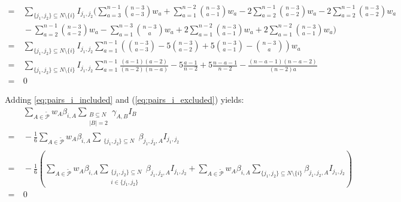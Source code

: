 \begin{equation}
\begin{array}{rll}
        = & \ \sum\limits_{\{j_1,j_2\} \subseteq N \setminus \{i\}} I_{j_1,j_2} \Bigg( \sum\limits_{a=3}^{n-1} \binom{n-3}{a-3} w_a + \sum\limits_{a=1}^{n-2} \binom{n-3}{a-1} w_a - 2\sum\limits_{a=2}^{n-1} \binom{n-3}{a-2} w_a - 2\sum\limits_{a=2}^{n-1} \binom{n-3}{a-2} w_a \\
        & \ - \sum\limits_{a=2}^{n-1} \binom{n-3}{a-2} w_a - \sum\limits_{a=1}^{n-3} \binom{n-3}{a} w_a + 2\sum\limits_{a=1}^{n-2} \binom{n-3}{a-1} w_a + 2\sum\limits_{a=1}^{n-2} \binom{n-3}{a-1} w_a \Bigg) \\
        = & \ \sum\limits_{\{j_1,j_2\} \subseteq N \setminus \{i\}} I_{j_1,j_2} \sum\limits_{a=1}^{n-1} \left( \binom{n-3}{a-3} -5 \binom{n-3}{a-2} + 5\binom{n-3}{a-1} - \binom{n-3}{a} \right) w_a \\
        = & \ \sum\limits_{\{j_1,j_2\} \subseteq N \setminus \{i\}} I_{j_1,j_2} \sum\limits_{a=1}^{n-1} \frac{(a-1)(a-2)}{(n-2)(n-a)} - 5\frac{a-1}{n-2} + 5\frac{n-a-1}{n-2} - \frac{(n-a-1)(n-a-2)}{(n-2)a}  \\
        = & \ 0
	\end{array}
\end{equation}

Adding \cref{eq:pairs_i_included} and (\ref{eq:pairs_i_excluded}) yields:
\begin{equation*}
	\begin{array}{rl}
        & \ \sum\limits_{A \in \tilde{\mathcal{P}}} w_A \beta_{i,A} \sum\limits_{\substack{B \subseteq N \\ |B| = 2}} \gamma_{A,B} I_B \\
        = & \ - \frac{1}{6} \sum\limits_{A \in \tilde{\mathcal{P}}} w_A \beta_{i,A} \sum\limits_{\substack{\{j_1,j_2\} \subseteq N}} \beta_{j_1,j_2,A} I_{j_1,j_2} \\
        = & \ - \frac{1}{6} \left( \sum\limits_{A \in \tilde{\mathcal{P}}} w_A \beta_{i,A} \sum\limits_{\substack{\{j_1,j_2\} \subseteq N \\ i \in \{j_1,j_2\}}} \beta_{j_1,j_2,A} I_{j_1,j_2} + \sum\limits_{A \in \tilde{\mathcal{P}}} w_A \beta_{i,A} \sum\limits_{\{j_1,j_2\} \subseteq N \setminus \{i\}} \beta_{j_1,j_2,A} I_{j_1,j_2} \right) \\
        = & \ 0
	\end{array}
\end{equation*}

